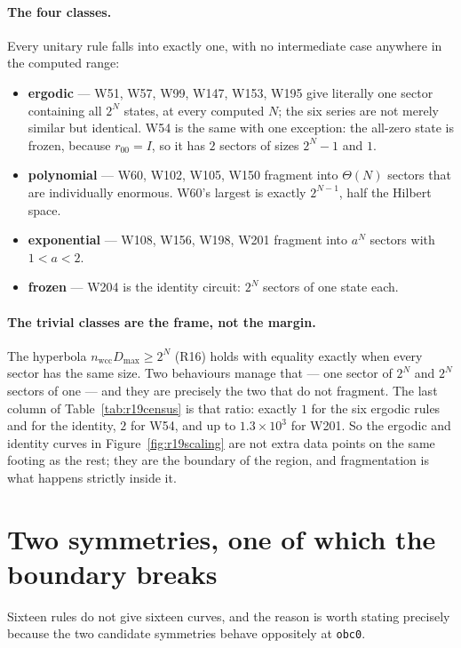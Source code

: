 \documentclass[11pt]{article}
\newcommand{\rt}[1]{\texttt{#1}}
\newcommand{\wcc}{\mathrm{wcc}}
\begin{document}
\paragraph{The four classes.} Every unitary rule falls into exactly one, with no
intermediate case anywhere in the computed range:
\begin{itemize}
  \item \textbf{ergodic} --- W51, W57, W99, W147, W153, W195 give literally one
    sector containing all $2^N$ states, at every computed $N$; the six series are
    not merely similar but identical. W54 is the same with one exception: the
    all-zero state is frozen, because $r_{00} = I$, so it has $2$ sectors of
    sizes $2^N-1$ and $1$.
  \item \textbf{polynomial} --- W60, W102, W105, W150 fragment into $\Theta(N)$
    sectors that are individually enormous. W60's largest is exactly $2^{N-1}$,
    half the Hilbert space.
  \item \textbf{exponential} --- W108, W156, W198, W201 fragment into $a^N$
    sectors with $1 < a < 2$.
  \item \textbf{frozen} --- W204 is the identity circuit: $2^N$ sectors of one
    state each.
\end{itemize}

\paragraph{The trivial classes are the frame, not the margin.} The hyperbola
$n_\wcc D_{\max} \ge 2^N$ (R16) holds with equality exactly when every sector has
the same size. Two behaviours manage that --- one sector of $2^N$ and $2^N$
sectors of one --- and they are precisely the two that do not fragment. The last
column of Table~\ref{tab:r19census} is that ratio: exactly $1$ for the six
ergodic rules and for the identity, $2$ for W54, and up to $1.3\times10^3$ for
W201. So the ergodic and identity curves in Figure~\ref{fig:r19scaling} are not
extra data points on the same footing as the rest; they are the boundary of the
region, and fragmentation is what happens strictly inside it.

\section{Two symmetries, one of which the boundary breaks}
\label{sec:symmetry}

Sixteen rules do not give sixteen curves, and the reason is worth stating
precisely because the two candidate symmetries behave oppositely at \rt{obc0}.
\end{document}
